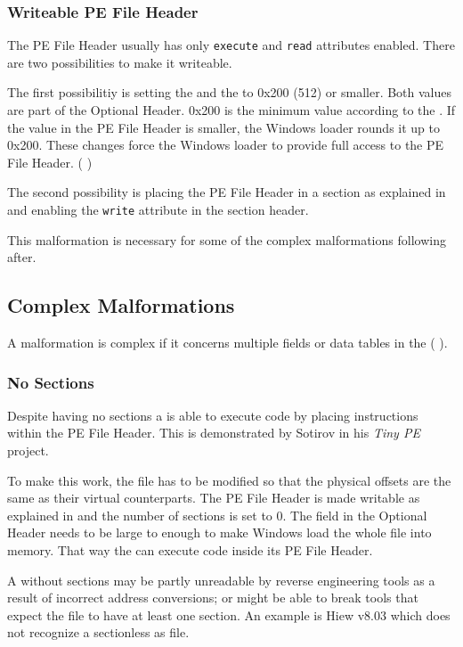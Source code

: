 \subsubsection*{Writeable PE File Header} \label{subsubsec:writeableheader}

The PE File Header usually has only \texttt{execute} and \texttt{read} attributes enabled. There are two possibilities to make it writeable. 

The first possibilitiy is setting the  and the  to 0x200 (512) or smaller. Both values are part of the Optional Header. 0x200 is the minimum value according to the \PECOFF{} \cite[]{pespec}. If the value in the PE File Header is smaller, the Windows loader rounds it up to 0x200.
These changes force the Windows loader to provide full access to the PE File Header. (\cf{} \cite[]{revlabs11})

The second possibility is placing the PE File Header in a section as explained in \emph{} and enabling the \texttt{write} attribute in the section header.

This malformation is necessary for some of the complex malformations following after.

\subsection{Complex Malformations}

A malformation is complex if it concerns multiple fields or data tables in the \PE{} (\cf{} \cite[slide 7]{vuksan11}).

\subsubsection*{No Sections}

Despite having no sections a \PE{} is able to execute code by placing instructions within the PE File Header. This is demonstrated by Sotirov in his \emph{Tiny PE} project. \cite{tinype}

To make this work, the file has to be modified so that the physical offsets are the same as their virtual counterparts. The PE File Header is made writable as explained in \emph{} and the number of sections is set to 0. The  field in the Optional Header needs to be large to enough to make Windows load the whole file into memory. That way the \PE{} can execute code inside its PE File Header.

A \PE{} without sections may be partly unreadable by reverse engineering tools as a result of incorrect address conversions; or might be able to break tools that expect the file to have at least one section. An example is Hiew v8.03 which does not recognize a sectionless \PE{} as \PE{} file.
